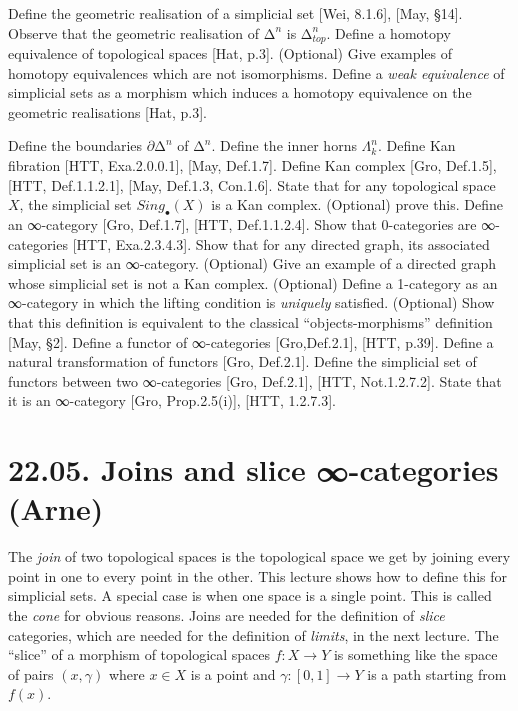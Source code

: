 \documentclass[a4paper]{amsart}
\numberwithin{figure}{section}
\theoremstyle{theorem}
\theoremstyle{definition}
\begin{document}
Define the geometric realisation of a simplicial set [Wei, 8.1.6], [May, §14]. %
Observe that the geometric realisation of $∆^n$ is $∆_{top}^n$. %
Define a homotopy equivalence of topological spaces [Hat, p.3]. %
(Optional) Give examples of homotopy equivalences which are not isomorphisms. %
Define a \emph{weak equivalence} of simplicial sets as a morphism which induces a homotopy equivalence on the geometric realisations [Hat, p.3]. %

Define the boundaries $\partial ∆^n$ of $∆^n$. %
Define the inner horns $\Lambda^n_k$. %
Define Kan fibration [HTT, Exa.2.0.0.1], [May, Def.1.7]. %
Define Kan complex [Gro, Def.1.5], [HTT, Def.1.1.2.1], [May, Def.1.3, Con.1.6]. %
State that for any topological space $X$, the simplicial set $Sing_\bullet(X)$ is a Kan complex. %
(Optional) prove this. %
Define an ∞-category [Gro, Def.1.7], [HTT, Def.1.1.2.4]. %
Show that 0-categories are ∞-categories [HTT, Exa.2.3.4.3]. %
Show that for any directed graph, its associated simplicial set is an ∞-category. %
(Optional) Give an example of a directed graph whose simplicial set is not a Kan complex. %
(Optional) Define a 1-category as an ∞-category in which the lifting condition is \emph{uniquely} satisfied. %
(Optional) Show that this definition is equivalent to the classical ``objects-morphisms'' definition [May, §2]. %
Define a functor of ∞-categories [Gro,Def.2.1], [HTT, p.39]. %
Define a natural transformation of functors [Gro, Def.2.1]. %
Define the simplicial set of functors between two ∞-categories [Gro, Def.2.1], [HTT, Not.1.2.7.2]. %
State that it is an ∞-category [Gro, Prop.2.5(i)], [HTT, 1.2.7.3]. %


\section{22.05. Joins and slice ∞-categories (Arne)}

The \emph{join} of two topological spaces is the topological space we get by joining every point in one to every point in the other. This lecture shows how to define this for simplicial sets. A special case is when one space is a single point. This is called the \emph{cone} for obvious reasons. Joins are needed for the definition of \emph{slice} categories, which are needed for the definition of \emph{limits}, in the next lecture. The ``slice'' of a morphism of topological spaces $f: X \to Y$ is something like the space of pairs $(x, \gamma)$ where $x \in X$ is a point and $\gamma: [0, 1] \to Y$ is a path starting from $f(x)$.
\end{document}
